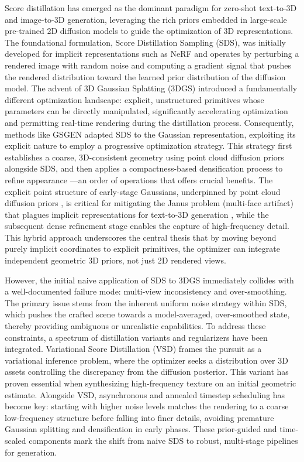 \documentclass[11pt,a4paper]{article}
\begin{document}
Score distillation has emerged as the dominant paradigm for zero-shot text-to-3D and image-to-3D generation, leveraging the rich priors embedded in large-scale pre-trained 2D diffusion models to guide the optimization of 3D representations. The foundational formulation, Score Distillation Sampling (SDS), was initially developed for implicit representations such as NeRF and operates by perturbing a rendered image with random noise and computing a gradient signal that pushes the rendered distribution toward the learned prior distribution of the diffusion model. The advent of 3D Gaussian Splatting (3DGS) introduced a fundamentally different optimization landscape: explicit, unstructured primitives whose parameters can be directly manipulated, significantly accelerating optimization and permitting real-time rendering during the distillation process. Consequently, methods like GSGEN \cite{arxiv:2309.16585v4} adapted SDS to the Gaussian representation, exploiting its explicit nature to employ a progressive optimization strategy. This strategy first establishes a coarse, 3D-consistent geometry using point cloud diffusion priors alongside SDS, and then applies a compactness-based densification process to refine appearance \cite{arxiv:2309.16585v4}---an order of operations that offers crucial benefits. The explicit point structure of early-stage Gaussians, underpinned by point cloud diffusion priors \cite{arxiv:1211.3297v2}, is critical for mitigating the Janus problem (multi-face artifact) that plagues implicit representations for text-to-3D generation \cite{arxiv:2309.16585v4}, while the subsequent dense refinement stage enables the capture of high-frequency detail. This hybrid approach underscores the central thesis that by moving beyond purely implicit coordinates to explicit primitives, the optimizer can integrate independent geometric 3D priors, not just 2D rendered views.

However, the initial naive application of SDS to 3DGS immediately collides with a well-documented failure mode: multi-view inconsistency and over-smoothing. The primary issue stems from the inherent uniform noise strategy within SDS, which pushes the crafted scene towards a model-averaged, over-smoothed state, thereby providing ambiguous or unrealistic capabilities. To address these constraints, a spectrum of distillation variants and regularizers have been integrated. Variational Score Distillation (VSD) frames the pursuit as a variational inference problem, where the optimizer seeks a distribution over 3D assets controlling the discrepancy from the diffusion posterior. This variant has proven essential when synthesizing high-frequency texture on an initial geometric estimate. Alongside VSD, asynchronous and annealed timestep scheduling has become key: starting with higher noise levels matches the rendering to a coarse low-frequency structure before falling into finer details, avoiding premature Gaussian splitting and densification in early phases. These prior-guided and time-scaled components mark the shift from naive SDS to robust, multi-stage pipelines for generation.
\end{document}
